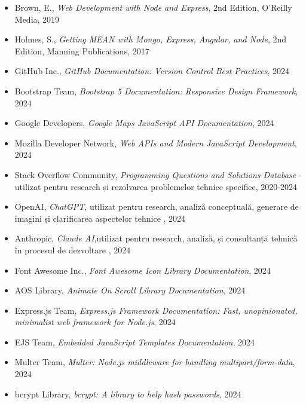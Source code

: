 \documentclass[12pt,a4paper]{report}
\begin{document}
\begin{itemize}
    \item Brown, E., \textit{Web Development with Node and Express}, 2nd Edition, O'Reilly Media, 2019
    \item Holmes, S., \textit{Getting MEAN with Mongo, Express, Angular, and Node}, 2nd Edition, Manning Publications, 2017
    \item GitHub Inc., \textit{GitHub Documentation: Version Control Best Practices}, 2024
    \item Bootstrap Team, \textit{Bootstrap 5 Documentation: Responsive Design Framework}, 2024
    \item Google Developers, \textit{Google Maps JavaScript API Documentation}, 2024
    \item Mozilla Developer Network, \textit{Web APIs and Modern JavaScript Development}, 2024
    \item Stack Overflow Community, \textit{Programming Questions and Solutions Database} - utilizat pentru research și rezolvarea problemelor tehnice specifice, 2020-2024
    \item OpenAI, \textit{ChatGPT}, utilizat pentru research, analiză conceptuală, generare de imagini și clarificarea aspectelor tehnice , 2024
    \item Anthropic, \textit{Claude AI},utilizat pentru research, analiză, și consultanță tehnică în procesul de dezvoltare , 2024
    \item Font Awesome Inc., \textit{Font Awesome Icon Library Documentation}, 2024
    \item AOS Library, \textit{Animate On Scroll Library Documentation}, 2024
    \item Express.js Team, \textit{Express.js Framework Documentation: Fast, unopinionated, minimalist web framework for Node.js}, 2024
    \item EJS Team, \textit{Embedded JavaScript Templates Documentation}, 2024
    \item Multer Team, \textit{Multer: Node.js middleware for handling multipart/form-data}, 2024
    \item bcrypt Library, \textit{bcrypt: A library to help hash passwords}, 2024
\end{itemize}
\end{document}
